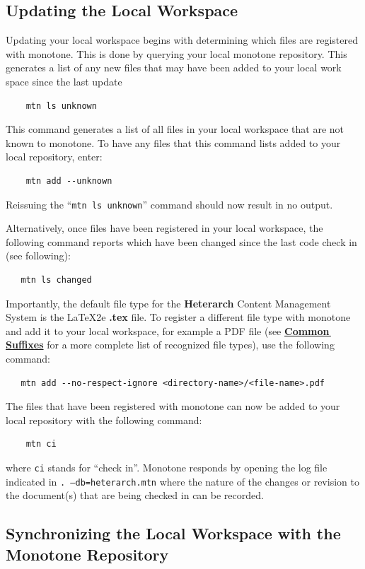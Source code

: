 \documentclass[12pt]{article}
\begin{document}
\subsection*{Updating the Local Workspace}

Updating your local workspace begins with determining which files are registered with monotone. This is done by querying your local monotone repository. This generates a list of any new files that may have been added to your local work space since the last update
\begin{verbatim}
    mtn ls unknown
\end{verbatim}
This command generates a list of all files in your local workspace that are not known to monotone. To have any files that this command lists added to your local repository, enter:
\begin{verbatim}
    mtn add --unknown
\end{verbatim}
Reissuing the ``{\tt mtn ls unknown}'' command should now result in no output.

Alternatively, once files have been registered in your local workspace, the following command reports which have been changed since the last code check in (see following):
\begin{verbatim}
   mtn ls changed
\end{verbatim}

Importantly, the default file type for the {\bf\small{Heterarch}} Content Management System is the \LaTeX2e\,\,{\bf .tex} file. To register a different file type with monotone and add it to your local workspace, for example a PDF file (see \href{../common-suffixes/common-suffixes.tex}{\bf Common\,Suffixes} for a more complete list of recognized file types), use the following command:
\begin{verbatim}
   mtn add --no-respect-ignore <directory-name>/<file-name>.pdf
\end{verbatim}

The files that have been registered with monotone can now be added to your local repository with the following command:
\begin{verbatim}
    mtn ci
\end{verbatim}
where {\tt ci} stands for ``check in''. Monotone responds by opening the log file indicated in {\tt .\,--db=heterarch.mtn} where the nature of the changes or revision to the document(s) that are being checked in can be recorded.

\subsection*{Synchronizing the Local Workspace with the Monotone Repository}
\end{document}
